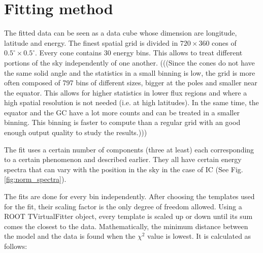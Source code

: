 
\newpage
\section{Fitting method}


The fitted data can be seen as a data cube whose dimension are longitude, latitude and energy. The finest spatial grid is divided in $720 \times 360$ cones of $ 0.5^\circ \times 0.5^\circ $. Every cone contains 30 energy bins. This allows to treat different portions of the sky independently of one another.
(((Since the cones do not have the same solid angle and the statistics in a small binning is low, the grid is more often composed of 797 bins of different sizes, bigger at the poles and smaller near the equator. This allows for higher statistics in lower flux regions and where a high spatial resolution is not needed (i.e. at high latitudes). In the same time, the equator and the GC have a lot more counts and can be treated in a smaller binning. This binning is faster to compute than a regular grid with an good enough output quality to study the results.)))

The fit uses a certain number of components (three at least) each corresponding to a certain phenomenon and described earlier. They all have certain energy spectra that can vary with the position in the sky in the case of IC (See Fig. \ref{fig:norm_spectra}).

The fits are done for every bin independently. After choosing the templates used for the fit, their scaling factor is the only degree of freedom allowed.  Using a ROOT TVirtualFitter object, every template is scaled up or down until its sum comes the closest to the data.
Mathematically, the minimum distance between the model and the data is found when the $\chi^2$ value is lowest. It is calculated as follows:

